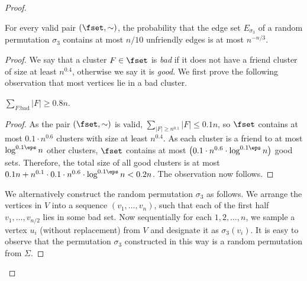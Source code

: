 \begin{proof}
\begin{claim}
\label{clm: number of permutation}
For every valid pair $(\fset,\sim)$, the probability that the edge set $E_{\sigma_3}$ of a random permutation $\sigma_3$ contains at most $n/10$ unfriendly edges is at most $n^{-n/3}$.
\end{claim}
\begin{proof}
We say that a cluster $F\in \fset$ is \emph{bad} if it does not have a friend cluster of size at least $n^{0.4}$, otherwise we say it is \emph{good}. We first prove the following observation that most vertices lie in a bad cluster.

\begin{observation}
$\sum_{F\text{:bad}}|F|\ge 0.8n$.
\end{observation}
\begin{proof}
As the pair $(\fset,\sim)$ is valid, $\sum_{|F|\ge n^{0.1}}|F|\le 0.1n$, so $\fset$ contains at most $0.1\cdot n^{0.6}$ clusters with size at least $n^{0.4}$. 
As each cluster is a friend to at most $\log^{0.1\eps} n$ other clusters, $\fset$ contains at most $\big(0.1\cdot n^{0.6}\cdot\log^{0.1\eps}n\big)$ good sets. Therefore, the total size of all good clusters is at most $0.1n + n^{0.1} \cdot 0.1 \cdot n^{0.6}\cdot\log^{0.1\eps}n < 0.2n$. The observation now follows.
\end{proof}


We alternatively construct the random permutation $\sigma_3$ as follows. We arrange the vertices in $V$ into a sequence $(v_1,\ldots,v_n)$, such that each of the first half $v_1,\ldots,v_{n/2}$ lies in some bad set. Now sequentially for each $1,2,\ldots,n$, we sample a vertex $u_i$ (without replacement) from $V$ and designate it as $\sigma_3(v_i)$. It is easy to observe that the permutation $\sigma_3$ constructed in this way is a random permutation from $\Sigma$.


\end{proof}
\end{proof}
